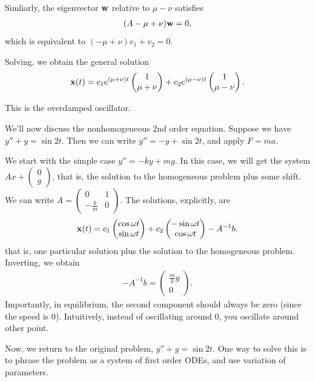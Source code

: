 \documentclass{article}
\newcommand{\mat}[1]{\begin{pmatrix}#1\end{pmatrix}}
\begin{document}
\begin{enumerate}
    Simliarly, the eigenvector $\mathbf{w}$ relative to $\mu - \nu$ satisfies
    \begin{align*}
      (A - \mu + \nu) \mathbf{w} = 0,
    \end{align*}
    which is equivalent to $\left( - \mu + \nu \right) v_1 + v_2 = 0$.

    Solving, we obtain the general solution
    \begin{align*}
      \mbf{x}(t) = c_1 e^{(\mu + \nu) t} \mat{1 \\ \mu + \nu} + c_2 e^{(\mu - \nu) t} \mat{1 \\ \mu - \nu}.
    \end{align*}

    This is the overdamped oscillator.



\end{enumerate}


We'll now discuss the nonhomogeneous 2nd order equation.  Suppose we have $y'' + y = \sin 2t$. Then we can write $y'' = -y + \sin 2t$, and apply $F = ma$.

We start with the simple case $y'' = -ky + mg$.  In this case, we will get the system $A x + \mat{0 \\ g}$, that is, the solution to the homogeneous problem plus some shift.  We can write $A = \mat{0 & 1 \\ - \frac{k}{m} & 0}$.  The solutions, explicitly, are
\begin{align*}
  \mbf{x}(t) = c_1 \mat{\cos \omega t \\ \sin \omega t} + c_2 \mat{- \sin \omega t \\ \cos \omega t} - A^{-1}b.
\end{align*}
that is, one particular solution plus the solution to the homogeneous problem.  Inverting, we obtain
\begin{align*}
  - A^{-1}b = \mat{\frac{m}{k} g \\ 0}.
\end{align*}
Importantly, in equilibrium, the second component should always be zero (since the speed is 0).  Intuitively, instead of oscillating around 0, you oscillate around other point.

Now, we return to the original problem, $y'' + y = \sin 2t$.  One way to solve this is to phrase the problem as a system of first order ODEs, and use variation of parameters.
\end{document}
